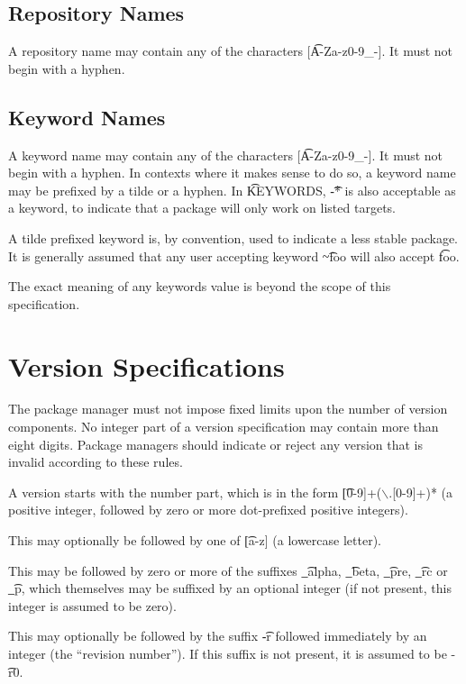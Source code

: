 \subsection{Repository Names}
\label{repository-names}
A repository name may contain any of the characters [\t{A-Za-z0-9\_-}]. It must not begin with a
hyphen.

\subsection{Keyword Names}
\label{keyword-names}
A keyword name may contain any of the characters [\t{A-Za-z0-9\_-}]. It must not begin with a
hyphen. In contexts where it makes sense to do so, a keyword name may be prefixed by
a tilde or a hyphen. In \t{KEYWORDS}, \t{-*} is also acceptable as a keyword, to indicate that
a package will only work on listed targets.

A tilde prefixed keyword is, by convention, used to indicate a less stable package. It is generally
assumed that any user accepting keyword \t{\textasciitilde{}foo} will also accept \t{foo}.

The exact meaning of any keywords value is beyond the scope of this specification.

\section{Version Specifications}
The package manager must not impose fixed limits upon the number of version components. No
integer part of a version specification may contain more than eight digits. Package managers should
indicate or reject any version that is invalid according to these rules.

A version starts with the number part, which is in the form \t{[0-9]+($\backslash$.[0-9]+)*} (a positive
integer, followed by zero or more dot-prefixed positive integers).

This may optionally be followed by one of \t{[a-z]} (a lowercase letter).

This may be followed by zero or more of the suffixes \t{\_alpha}, \t{\_beta}, \t{\_pre},
\t{\_rc} or \t{\_p}, which themselves may be suffixed by an optional integer (if not present,
this integer is assumed to be zero).

This may optionally be followed by the suffix \t{-r} followed immediately by an integer (the
``revision number''). If this suffix is not present, it is assumed to be \t{-r0}.


